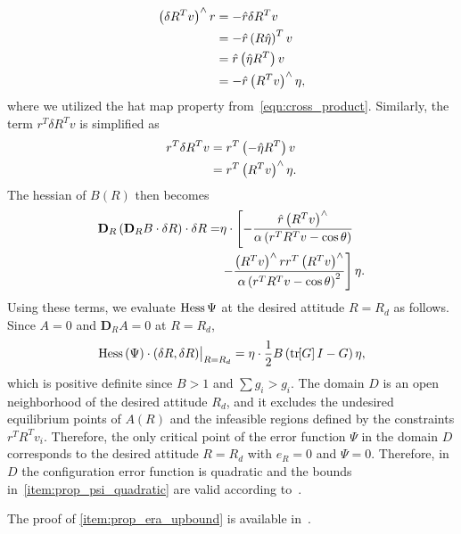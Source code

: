 \begin{align*}
    \left( \delta R^T v \right)^\wedge r &= - \hat{r} \delta R ^T v  \\
    &= - \hat{r} \left( R \hat \eta \right)^T v  \\
    &= \hat{r} \left( \hat{\eta} R^T  \right) v  \\
    &= - \hat{r} \left( R^T v \right)^\wedge \eta ,
\end{align*}
where we utilized the hat map property from~\cref{eqn:cross_product}.
Similarly, the term \( r^T \delta R^T v \) is simplified as
\begin{align*}
    r^T \delta R^T v &= r^T \left( -\hat \eta R^T \right)v  \\
    &= r^T \left( R^T v \right)^\wedge \eta .
\end{align*}
The hessian of \( B(R) \) then becomes
\begin{align*}
    \mathbf{D}_{R} \left( \mathbf{D}_{R} B \cdot \delta R \right) \cdot \delta R =& \eta \cdot \left[ - \frac{ \hat r \left( R^T v \right)^\wedge}{\alpha \left( r^T R^T v - \cos \theta \right)} \right. \\ 
    & \left. - \frac{\left( R^T v \right)^\wedge r r^T \left( R^T v \right)^\wedge }{ \alpha\left( r^T R^T v - \cos \theta \right)^2}  \right] \eta .
\end{align*}
Using these terms, we evaluate \( \mathrm{Hess} \, \Psi \) at the desired attitude \( R = R_d \) as follows. Since $A=0$ and $\mathbf{D}_R A=0$ at $R=R_d$, 
\begin{align*}
    \mathrm{Hess} \, (\Psi)\cdot (\delta R,\delta R)\big|_{R=R_d} = \eta \cdot \frac{1}{2} B \left( \mathrm{tr}\negthickspace\left[ G \right]I -  G \right) \eta , 
\end{align*}
which is positive definite since \( B > 1\) and \( \sum g_i > g_i\). 
The domain \( D \) is an open neighborhood of the desired attitude \( R_d \), and it excludes the undesired equilibrium points of \( A(R) \) and the infeasible regions defined by the constraints \( r^T R^T v_i \). 
Therefore, the only critical point of the error function $\Psi$ in the domain $D$ corresponds to the desired attitude $R=R_d$ with $e_R=0$ and $\Psi=0$. 
Therefore, in \( D \) the configuration error function is quadratic and the bounds in~\cref{item:prop_psi_quadratic} are valid according to~\cite[Proposition 6.30]{bullo2004}.

The proof of \cref{item:prop_era_upbound} is available in~\cite{LeeITCST13}.

